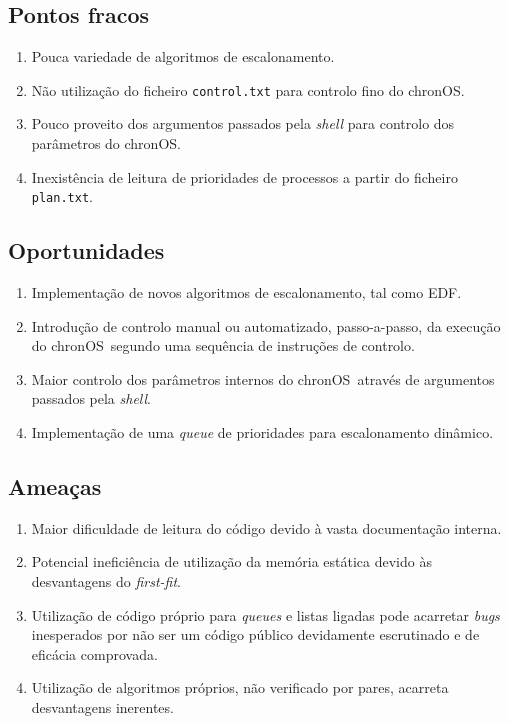 \documentclass[10pt,oneside]{estiloUBI}
\newcommand{\chronOS}{\textsf{chronOS}}
\begin{document}
	
	\subsection{Pontos fracos}
	
	\begin{enumerate}
		\item Pouca variedade de algoritmos de escalonamento.
		\item Não utilização do ficheiro \verb|control.txt| para controlo fino do \chronOS.
		\item Pouco proveito dos argumentos passados pela \textit{shell} para controlo dos parâmetros do \chronOS.
		\item Inexistência de leitura de prioridades de processos a partir do ficheiro \verb|plan.txt|.
	\end{enumerate}
	
	
	\subsection{Oportunidades}
	
	\begin{enumerate}
		\item Implementação de novos algoritmos de escalonamento, tal como \ac{EDF}.
		\item Introdução de controlo manual ou automatizado, passo-a-passo, da execução do \chronOS~segundo uma sequência de instruções de controlo.
		\item Maior controlo dos parâmetros internos do \chronOS~através de argumentos passados pela \textit{shell}.
		\item Implementação de uma \textit{queue} de prioridades para escalonamento dinâmico.
	\end{enumerate}
	
	
	\subsection{Ameaças}
	
	\begin{enumerate}
		\item Maior dificuldade de leitura do código devido à vasta documentação interna.
		\item Potencial ineficiência de utilização da memória estática devido às desvantagens do \textit{first-fit}.
		\item Utilização de código próprio para \textit{queues} e listas ligadas pode acarretar \textit{bugs} inesperados por não ser um código público devidamente escrutinado e de eficácia comprovada.
		\item Utilização de algoritmos próprios, não verificado por pares, acarreta desvantagens inerentes.
	\end{enumerate}
	
\end{document}
